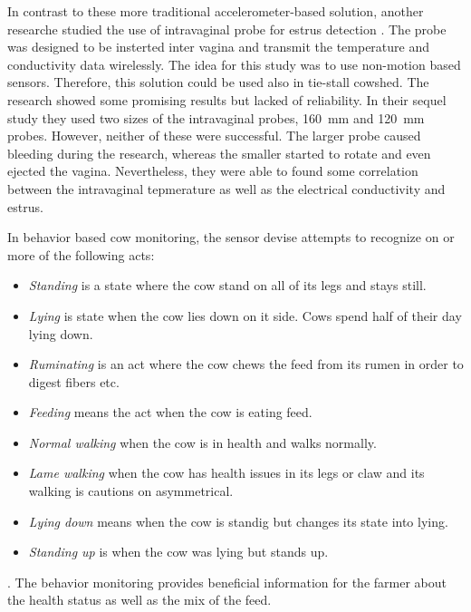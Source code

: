 \documentclass[english,12pt,a4paper,pdftex,elec,utf8]{aaltothesis}
\begin{document}
In contrast to these more traditional accelerometer-based solution,  another researche studied the use of intravaginal probe for estrus detection \cite{Andersson2016101} \cite{7370219}. The probe was designed to be insterted inter vagina and transmit the temperature and conductivity data wirelessly. The idea for this study was to use non-motion based sensors. Therefore, this solution could be used  also in tie-stall cowshed. The research showed some promising results but lacked of reliability. In their sequel study they used two sizes of the intravaginal probes, \SI{160}{\milli \metre} and \SI{120}{\milli \metre} probes. However, neither of these were successful. The larger probe caused bleeding during the research, whereas the smaller started to rotate and even ejected the vagina. Nevertheless, they were able to found some correlation between the intravaginal tepmerature as well as the electrical conductivity and estrus.





In behavior based cow monitoring, the sensor devise attempts to recognize on or more of the following acts:

\begin{itemize}
\item \textit{Standing} is a state where the cow stand on all of its legs and stays still.
\item \textit{Lying} is state when the cow lies down on it side. Cows spend half of their day lying down.
\item \textit{Ruminating} is an act where the cow chews the feed from its rumen in order to digest fibers etc.
\item \textit{Feeding} means the act when the cow is eating feed.
\item \textit{Normal walking} when the cow is in health and walks normally.
\item \textit{Lame walking} when the cow has health issues in its legs or claw and its walking is cautions on asymmetrical.
\item \textit{Lying down} means when the cow is standig but changes its state into lying.
\item \textit{Standing up} is when the cow was lying but stands up.
\end{itemize}. The behavior monitoring provides beneficial information for the farmer about the health status as well as the mix of the feed.
\end{document}
